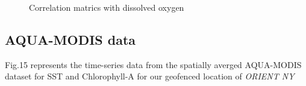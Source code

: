 \begin{figure}[H]
    \hfill
    \quad
    \caption{Correlation matrics with dissolved oxygen}
\end{figure}



\subsection{AQUA-MODIS data}
    Fig.15 represents the time-series data from the spatially averged AQUA-MODIS dataset for SST and Chlorophyll-A for our geofenced location of \textit{ORIENT NY}

